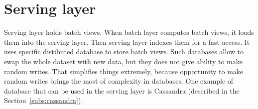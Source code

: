 \section{Serving layer}

Serving layer holds batch views.
When batch layer computes batch views, it loads them into the serving layer.
Then serving layer indexes them for a fast access.
It uses specific distibuted database to store batch views.
Such databases allow to swap the whole dataset with new data, but they does not give ability to make random writes.
That simplifies things extremely, because opportunity to make random writes brings the most of complexity in databases.
One example of database that can be used in the serving layer is Cassandra (described in the Section~\ref{subs:cassandra}).
